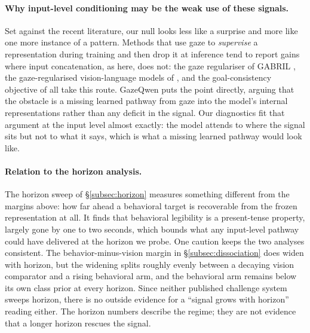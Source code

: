 \paragraph{Why input-level conditioning may be the weak use of these signals.}
Set against the recent literature, our null looks less like a surprise and more
like one more instance of a pattern. Methods that use gaze to \emph{supervise} a
representation during training and then drop it at inference tend to report gains
where input concatenation, as here, does not: the gaze regulariser of
GABRIL \citep{banayeeanzade2025gabril}, the gaze-regularised vision-language
models of \citet{pani2026gazereg}, and the goal-consistency objective of
\citet{royfernando2022abstractgoal} all take this route. GazeQwen puts the point
directly, arguing that the obstacle is a missing learned pathway from gaze into
the model's internal representations rather than any deficit in the signal. Our
diagnostics fit that argument at the input level almost exactly: the model
attends to where the signal sits but not to what it says, which is what a missing
learned pathway would look like.

\paragraph{Relation to the horizon analysis.}
The horizon sweep of \S\ref{subsec:horizon} measures something different from the
margins above: how far ahead a behavioral target is recoverable from the frozen
representation at all. It finds that behavioral legibility is a present-tense
property, largely gone by one to two seconds, which bounds what any input-level
pathway could have delivered at the horizon we probe. One caution keeps the two
analyses consistent. The behavior-minus-vision margin in \S\ref{subsec:dissociation} does widen with
horizon, but the widening splits roughly evenly between a decaying vision
comparator and a rising behavioral arm, and the behavioral arm remains below its
own class prior at every horizon. Since neither published challenge system sweeps
horizon, there is no outside evidence for a ``signal grows with horizon'' reading
either. The
horizon numbers describe the regime; they are not evidence that a longer horizon
rescues the signal.